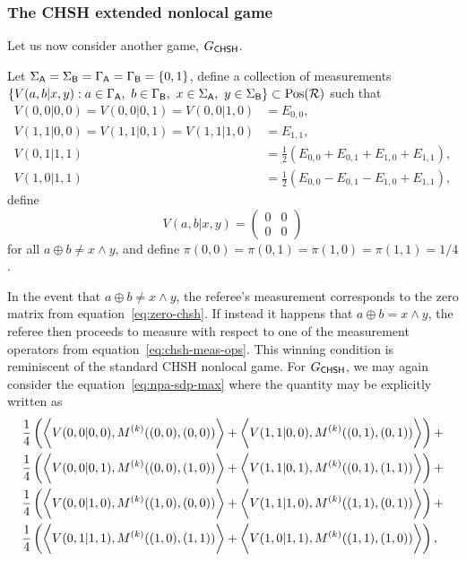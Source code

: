 \subsubsection*{The CHSH extended nonlocal game}

Let us now consider another game, $G_{\mathsf{CHSH}}$. 
\begin{example}
	Let $\Sigma_{\mathsf{A}} = \Sigma_{\mathsf{B}} = \Gamma_{\mathsf{A}} = \Gamma_{\mathsf{B}} = \{0,1\}$, define a collection of measurements $\{V(a,b | x,y) : a \in \GammaA, \ b \in \GammaB, \ x \in \SigmaA, \ y \in \SigmaB \} \subset \Pos(\R)$ such that 
	\begin{equation} \label{eq:chsh-meas-ops}
	\begin{aligned}
		V(0,0|0,0) = V(0,0|0,1) = V(0,0|1,0) &= E_{0,0}, \\
		V(1,1|0,0) = V(1,1|0,1) = V(1,1|1,0) &= E_{1,1}, \\
		V(0,1|1,1) &= \frac{1}{2} \left( E_{0,0} + E_{0,1} + E_{1,0} + E_{1,1} \right), \\
		V(1,0|1,1) &= \frac{1}{2} \left( E_{0,0} - E_{0,1} - E_{1,0} + E_{1,1} \right),
	\end{aligned}
	\end{equation}
	define 
	\begin{equation} \label{eq:zero-chsh}
		V(a,b|x,y) = \begin{pmatrix} 0 & 0 \\ 0 & 0 \end{pmatrix}
	\end{equation}
for all $a \oplus b \not= x \land y$, and define $\pi(0,0) = \pi(0,1) = \pi(1,0) = \pi(1,1) = 1/4$. 
\end{example}
In the event that $a \oplus b \not= x \land y$, the referee's measurement corresponds to the zero matrix from equation~\eqref{eq:zero-chsh}. If instead it happens that $a \oplus b = x \land y$, the referee then proceeds to measure with respect to one of the measurement operators from equation~\eqref{eq:chsh-meas-ops}. This winning condition is reminiscent of the standard CHSH nonlocal game. For $G_{\mathsf{CHSH}}$, we may again consider the equation~\eqref{eq:npa-sdp-max} where the quantity may be explicitly written as 
\begin{equation}
	\begin{aligned}
		& \frac{1}{4} \left( \biggl\langle V(0,0|0,0), M^{(k)}((0,0),(0,0)) \biggr\rangle + \biggl\langle V(1,1|0,0), M^{(k)}((0,1),(0,1)) \biggr\rangle \right) + \\
		& \frac{1}{4} \left( \biggl\langle V(0,0|0,1), M^{(k)}((0,0),(1,0)) \biggr\rangle + \biggl\langle V(1,1|0,1), M^{(k)}((0,1),(1,1)) \biggr\rangle \right) + \\
		& \frac{1}{4} \left( \biggl\langle V(0,0|1,0), M^{(k)}((1,0),(0,0)) \biggr\rangle + \biggl\langle V(1,1|1,0), M^{(k)}((1,1),(0,1)) \biggr\rangle \right) + \\
		& \frac{1}{4} \left( \biggl\langle V(0,1|1,1), M^{(k)}((1,0),(1,1)) \biggr\rangle + \biggl\langle V(1,0|1,1), M^{(k)}((1,1),(1,0)) \biggr\rangle \right),
	\end{aligned}
\end{equation}
